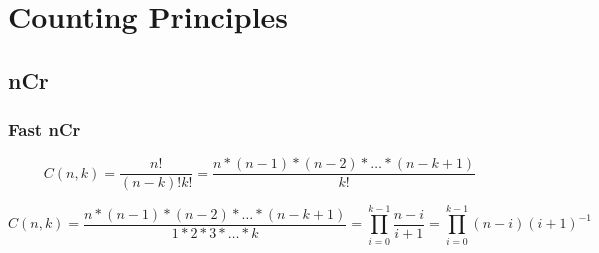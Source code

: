 \section{Counting Principles}
	\subsection{nCr}
		\subsubsection{Fast nCr}
			\[
			C(n,k) = \dfrac{n!}{(n-k)!k!} = \dfrac{n*(n-1)*(n-2)*\ldots*(n-k+1)}{k!}
			\]
			
			\[
			C(n,k) = \dfrac{n*(n-1)*(n-2)*\ldots*(n-k+1)}{1*2*3*\ldots*k} = \prod\limits_{i=0}^{k-1} \dfrac{n-i}{i+1} = \prod\limits_{i=0}^{k-1} (n-i)(i+1)^{-1}
			\]
			
